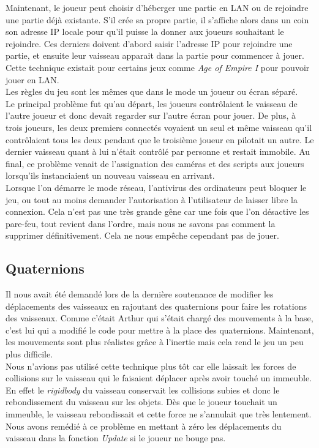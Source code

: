 \documentclass[10pt, titlepage]{report}
\begin{document}
Maintenant, le joueur peut choisir d'héberger une partie en LAN ou de rejoindre une partie déjà existante. S'il crée sa propre partie, il s'affiche alors dans un coin son adresse IP locale pour qu'il puisse la donner aux joueurs souhaitant le rejoindre. Ces derniers doivent d'abord saisir l'adresse IP pour rejoindre une partie, et ensuite leur vaisseau apparait dans la partie pour commencer à jouer. Cette technique existait pour certains jeux comme \textit{Age of Empire I} pour pouvoir jouer en LAN.\\

Les règles du jeu sont les mêmes que dans le mode un joueur ou écran séparé.\\

Le principal problème fut qu'au départ, les joueurs contrôlaient le vaisseau de l'autre joueur et donc devait regarder sur l'autre écran pour jouer. De plus, à trois joueurs, les deux premiers connectés voyaient un seul et même vaisseau qu'il contrôlaient tous les deux pendant que le troisième joueur en pilotait un autre. Le dernier vaisseau quant à lui n'était contrôlé par personne et restait immobile. Au final, ce problème venait de l'assignation des caméras et des scripts aux joueurs lorsqu'ils instanciaient un nouveau vaisseau en arrivant.\\

Lorsque l'on démarre le mode réseau, l'antivirus des ordinateurs peut bloquer le jeu, ou tout au moins demander l'autorisation à l'utilisateur de laisser libre la connexion. Cela n'est pas une très grande gêne car une fois que l'on désactive les pare-feu, tout revient dans l'ordre, mais nous ne savons pas comment la supprimer définitivement. Cela ne nous empêche cependant pas de jouer.\\

\subsection{Quaternions}
Il nous avait été demandé lors de la dernière soutenance de modifier les déplacements des vaisseaux en rajoutant des quaternions pour faire les rotations des vaisseaux. Comme c'était Arthur qui s'était chargé des mouvements à la base, c'est lui qui a modifié le code pour mettre à la place des quaternions. Maintenant, les mouvements sont plus réalistes grâce à l'inertie mais cela rend le jeu un peu plus difficile.\\

Nous n'avions pas utilisé cette technique plus tôt car elle laissait les forces de collisions sur le vaisseau qui le faisaient déplacer après avoir touché un immeuble. En effet le \textit{rigidbody} du vaisseau conservait les collisions subies et donc le rebondissement du vaisseau sur les objets. Dès que le joueur touchait un immeuble, le vaisseau rebondissait et cette force ne s'annulait que très lentement. Nous avons remédié à ce problème en mettant à zéro les déplacements du vaisseau dans la fonction \textit{Update} si le joueur ne bouge pas.\\
\end{document}
